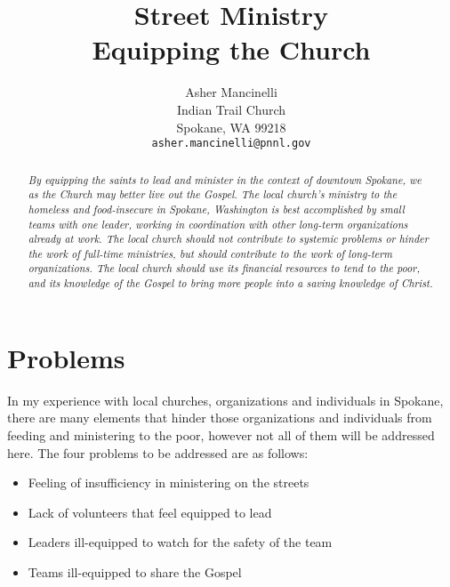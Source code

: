\documentclass[12pt]{article}
\title{Street Ministry \\
        \large Equipping the Church}
\author{Asher Mancinelli \\
        Indian Trail Church \\
        Spokane, WA 99218 \\
        \texttt{asher.mancinelli@pnnl.gov} \\ }
\begin{document}
\maketitle

\begin{abstract}
    \textit{
    By equipping the saints to lead and minister in the context of downtown Spokane, we as the Church may better live out the Gospel.
    The local church's ministry to the homeless and food-insecure in Spokane, Washington is best accomplished by small teams with one leader, working in coordination with other long-term organizations already at work.
    The local church should not contribute to systemic problems or hinder the work of full-time ministries, but should contribute to the work of long-term organizations.
    The local church should use its financial resources to tend to the poor, and its knowledge of the Gospel to bring more people into a saving knowledge of Christ.
    }
\end{abstract}


\qFirstCorTwelveTwentyEight

\section{Problems}

    In my experience with local churches, organizations and individuals in Spokane, there are many elements that hinder those organizations and individuals from feeding and ministering to the poor, however not all of them will be addressed here.
    The four problems to be addressed are as follows:
    \begin{itemize}
        \item Feeling of insufficiency in ministering on the streets
        \item Lack of volunteers that feel equipped to lead
        \item Leaders ill-equipped to watch for the safety of the team
        \item Teams ill-equipped to share the Gospel
    \end{itemize}
\end{document}
